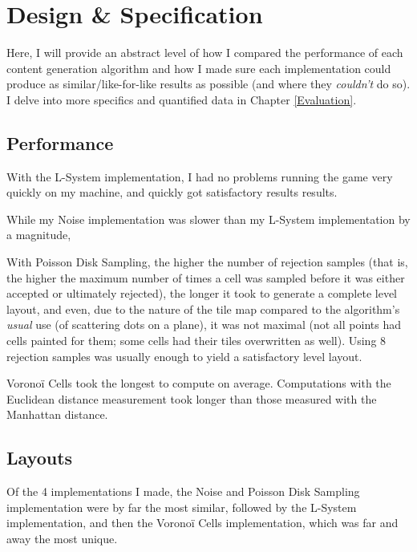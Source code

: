 \chapter{Design \& Specification} \label{Design}
  
% 

Here, I will provide an abstract level of how I compared the performance of each content generation algorithm and how I made sure each implementation could produce as similar/like-for-like results as possible (and where they \textit{couldn't} do so). I delve into more specifics and quantified data in Chapter \ref{Evaluation}.

\section{Performance}

With the L-System implementation, I had no problems running the game very quickly on my machine, and quickly got satisfactory results results.

While my Noise implementation was slower than my L-System implementation by a magnitude, 

With Poisson Disk Sampling, the higher the number of rejection samples (that is, the higher the maximum number of times a cell was sampled before it was either accepted or ultimately rejected), the longer it took to generate a complete level layout, and even, due to the nature of the tile map compared to the algorithm's \textit{usual} use (of scattering dots on a plane), it was not maximal (not all points had cells painted for them; some cells had their tiles overwritten as well). Using 8 rejection samples was usually enough to yield a satisfactory level layout.

Voronoï Cells took the longest to compute on average. Computations with the Euclidean distance measurement took longer than those measured with the Manhattan distance.

\section{Layouts}

Of the 4 implementations I made, the Noise and Poisson Disk Sampling implementation were by far the most similar, followed by the L-System implementation, and then the Voronoï Cells implementation, which was far and away the most unique.

